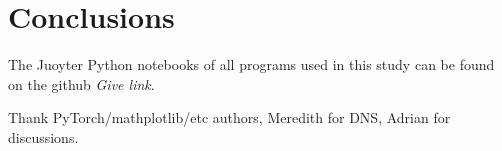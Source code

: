 \documentclass{svjour3}                     %
\begin{document}
\section{Conclusions}

The Juoyter Python notebooks of all programs used in this study can be found on the github \textit{Give link}.

\begin{acknowledgements}
Thank PyTorch/mathplotlib/etc authors, Meredith for DNS, Adrian for discussions.
\end{acknowledgements}





\end{document}
